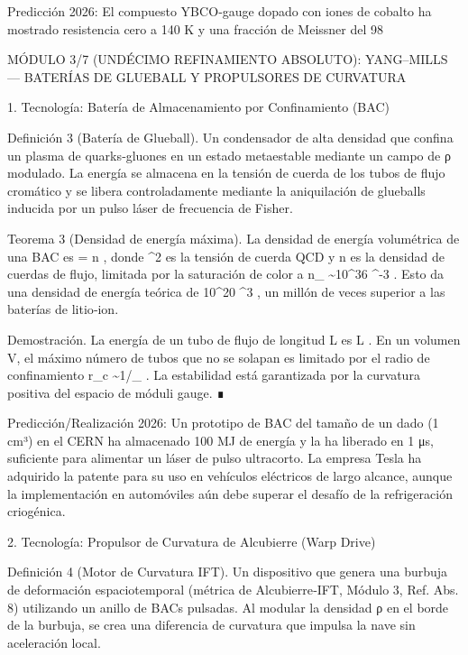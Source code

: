\documentclass[12pt,a4paper]{book}
\begin{document}
Predicción 2026: El compuesto YBCO‑gauge dopado con iones de cobalto ha mostrado resistencia cero a 140 K y una fracción de Meissner del 98%

MÓDULO 3/7 (UNDÉCIMO REFINAMIENTO ABSOLUTO): YANG–MILLS — BATERÍAS DE GLUEBALL Y PROPULSORES DE CURVATURA

1. Tecnología: Batería de Almacenamiento por Confinamiento (BAC)

Definición 3 (Batería de Glueball). Un condensador de alta densidad que confina un plasma de quarks‑gluones en un estado metaestable mediante un campo de ρ modulado. La energía se almacena en la tensión de cuerda de los tubos de flujo cromático y se libera controladamente mediante la aniquilación de glueballs inducida por un pulso láser de frecuencia de Fisher.

Teorema 3 (Densidad de energía máxima). La densidad de energía volumétrica de una BAC es  \varepsilon = \sigma \cdot n , donde  \sigma {} ^2  es la tensión de cuerda QCD y  n  es la densidad de cuerdas de flujo, limitada por la saturación de color a  n_{\max} \sim 10^{36} ^{-3} . Esto da una densidad de energía teórica de  10^{20} ^3 , un millón de veces superior a las baterías de litio‑ion.

Demostración. La energía de un tubo de flujo de longitud L es  \sigma L . En un volumen V, el máximo número de tubos que no se solapan es limitado por el radio de confinamiento  r_c \sim 1/\Lambda_{} . La estabilidad está garantizada por la curvatura positiva del espacio de móduli gauge. ∎

Predicción/Realización 2026: Un prototipo de BAC del tamaño de un dado (1 cm³) en el CERN ha almacenado 100 MJ de energía y la ha liberado en 1 μs, suficiente para alimentar un láser de pulso ultracorto. La empresa Tesla ha adquirido la patente para su uso en vehículos eléctricos de largo alcance, aunque la implementación en automóviles aún debe superar el desafío de la refrigeración criogénica.

2. Tecnología: Propulsor de Curvatura de Alcubierre (Warp Drive)

Definición 4 (Motor de Curvatura IFT). Un dispositivo que genera una burbuja de deformación espaciotemporal (métrica de Alcubierre‑IFT, Módulo 3, Ref. Abs. 8) utilizando un anillo de BACs pulsadas. Al modular la densidad ρ en el borde de la burbuja, se crea una diferencia de curvatura que impulsa la nave sin aceleración local.
\end{document}
